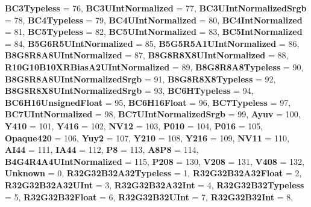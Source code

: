 \begin{DoxyCompactItemize}
\newline
{\bfseries B\+C3\+Typeless} = 76, 
{\bfseries B\+C3\+U\+Int\+Normalized} = 77, 
{\bfseries B\+C3\+U\+Int\+Normalized\+Srgb} = 78, 
{\bfseries B\+C4\+Typeless} = 79, 
\newline
{\bfseries B\+C4\+U\+Int\+Normalized} = 80, 
{\bfseries B\+C4\+Int\+Normalized} = 81, 
{\bfseries B\+C5\+Typeless} = 82, 
{\bfseries B\+C5\+U\+Int\+Normalized} = 83, 
\newline
{\bfseries B\+C5\+Int\+Normalized} = 84, 
{\bfseries B5\+G6\+R5\+U\+Int\+Normalized} = 85, 
{\bfseries B5\+G5\+R5\+A1\+U\+Int\+Normalized} = 86, 
{\bfseries B8\+G8\+R8\+A8\+U\+Int\+Normalized} = 87, 
\newline
{\bfseries B8\+G8\+R8\+X8\+U\+Int\+Normalized} = 88, 
{\bfseries R10\+G10\+B10\+X\+R\+Bias\+A2\+U\+Int\+Normalized} = 89, 
{\bfseries B8\+G8\+R8\+A8\+Typeless} = 90, 
{\bfseries B8\+G8\+R8\+A8\+U\+Int\+Normalized\+Srgb} = 91, 
\newline
{\bfseries B8\+G8\+R8\+X8\+Typeless} = 92, 
{\bfseries B8\+G8\+R8\+X8\+U\+Int\+Normalized\+Srgb} = 93, 
{\bfseries B\+C6\+H\+Typeless} = 94, 
{\bfseries B\+C6\+H16\+Unsigned\+Float} = 95, 
\newline
{\bfseries B\+C6\+H16\+Float} = 96, 
{\bfseries B\+C7\+Typeless} = 97, 
{\bfseries B\+C7\+U\+Int\+Normalized} = 98, 
{\bfseries B\+C7\+U\+Int\+Normalized\+Srgb} = 99, 
\newline
{\bfseries Ayuv} = 100, 
{\bfseries Y410} = 101, 
{\bfseries Y416} = 102, 
{\bfseries N\+V12} = 103, 
\newline
{\bfseries P010} = 104, 
{\bfseries P016} = 105, 
{\bfseries Opaque420} = 106, 
{\bfseries Yuy2} = 107, 
\newline
{\bfseries Y210} = 108, 
{\bfseries Y216} = 109, 
{\bfseries N\+V11} = 110, 
{\bfseries A\+I44} = 111, 
\newline
{\bfseries I\+A44} = 112, 
{\bfseries P8} = 113, 
{\bfseries A8\+P8} = 114, 
{\bfseries B4\+G4\+R4\+A4\+U\+Int\+Normalized} = 115, 
\newline
{\bfseries P208} = 130, 
{\bfseries V208} = 131, 
{\bfseries V408} = 132, 
{\bfseries Unknown} = 0, 
\newline
{\bfseries R32\+G32\+B32\+A32\+Typeless} = 1, 
{\bfseries R32\+G32\+B32\+A32\+Float} = 2, 
{\bfseries R32\+G32\+B32\+A32\+U\+Int} = 3, 
{\bfseries R32\+G32\+B32\+A32\+Int} = 4, 
\newline
{\bfseries R32\+G32\+B32\+Typeless} = 5, 
{\bfseries R32\+G32\+B32\+Float} = 6, 
{\bfseries R32\+G32\+B32\+U\+Int} = 7, 
{\bfseries R32\+G32\+B32\+Int} = 8, 

\end{DoxyCompactItemize}

